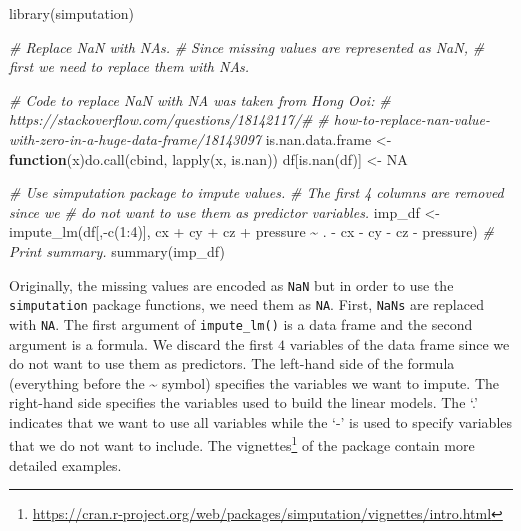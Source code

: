 \documentclass[
  11pt,
]{krantz}
\newenvironment{Shaded}{\begin{snugshade}}{\end{snugshade}}
\newcommand{\CommentTok}[1]{\textcolor[rgb]{0.37,0.37,0.37}{\textit{#1}}}
\newcommand{\ConstantTok}[1]{\textcolor[rgb]{0,0,0}{#1}}
\newcommand{\ControlFlowTok}[1]{\textcolor[rgb]{0.27,0.27,0.27}{\textbf{#1}}}
\newcommand{\DecValTok}[1]{\textcolor[rgb]{0.06,0.06,0.06}{#1}}
\newcommand{\FunctionTok}[1]{\textcolor[rgb]{0,0,0}{#1}}
\newcommand{\NormalTok}[1]{#1}
\newcommand{\OtherTok}[1]{\textcolor[rgb]{0.37,0.37,0.37}{#1}}
\newcommand{\SpecialCharTok}[1]{\textcolor[rgb]{0,0,0}{#1}}
\begin{document}
\begin{Shaded}
\begin{Highlighting}[]
\FunctionTok{library}\NormalTok{(simputation)}

\CommentTok{\# Replace NaN with NAs.}
\CommentTok{\# Since missing values are represented as NaN,}
\CommentTok{\# first we need to replace them with NAs.}

\CommentTok{\# Code to replace NaN with NA was taken from Hong Ooi:}
\CommentTok{\# https://stackoverflow.com/questions/18142117/\#}
\CommentTok{\# how{-}to{-}replace{-}nan{-}value{-}with{-}zero{-}in{-}a{-}huge{-}data{-}frame/18143097}
\NormalTok{is.nan.data.frame }\OtherTok{\textless{}{-}} \ControlFlowTok{function}\NormalTok{(x)}\FunctionTok{do.call}\NormalTok{(cbind, }\FunctionTok{lapply}\NormalTok{(x, is.nan))}
\NormalTok{df[}\FunctionTok{is.nan}\NormalTok{(df)] }\OtherTok{\textless{}{-}} \ConstantTok{NA}

\CommentTok{\# Use simputation package to impute values.}
\CommentTok{\# The first 4 columns are removed since we }
\CommentTok{\# do not want to use them as predictor variables.}
\NormalTok{imp\_df }\OtherTok{\textless{}{-}} \FunctionTok{impute\_lm}\NormalTok{(df[,}\SpecialCharTok{{-}}\FunctionTok{c}\NormalTok{(}\DecValTok{1}\SpecialCharTok{:}\DecValTok{4}\NormalTok{)],}
\NormalTok{                    cx }\SpecialCharTok{+}\NormalTok{ cy }\SpecialCharTok{+}\NormalTok{ cz }\SpecialCharTok{+}\NormalTok{ pressure }\SpecialCharTok{\textasciitilde{}}\NormalTok{ . }\SpecialCharTok{{-}}\NormalTok{ cx }\SpecialCharTok{{-}}\NormalTok{ cy }\SpecialCharTok{{-}}\NormalTok{ cz }\SpecialCharTok{{-}}\NormalTok{ pressure)}
\CommentTok{\# Print summary.}
\FunctionTok{summary}\NormalTok{(imp\_df)}
\end{Highlighting}
\end{Shaded}

Originally, the missing values are encoded as \texttt{NaN} but in order to use the \texttt{simputation} package functions, we need them as \texttt{NA}. First, \texttt{NaNs} are replaced with \texttt{NA}. The first argument of \texttt{impute\_lm()} is a data frame and the second argument is a formula. We discard the first \(4\) variables of the data frame since we do not want to use them as predictors. The left-hand side of the formula (everything before the \textasciitilde{} symbol) specifies the variables we want to impute. The right-hand side specifies the variables used to build the linear models. The `.' indicates that we want to use all variables while the `-' is used to specify variables that we do not want to include. The vignettes\footnote{\url{https://cran.r-project.org/web/packages/simputation/vignettes/intro.html}} of the package contain more detailed examples.
\end{document}
